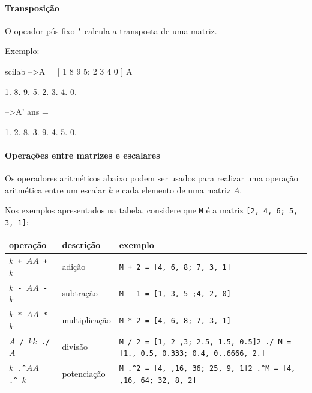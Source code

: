 \documentclass[11pt,fleqn]{practice}
\begin{document}
\paragraph{Transposição}

O opeador pós-fixo \texttt{'} calcula a transposta de uma matriz.

Exemplo:
\begin{lst}{scilab}
-->A = [ 1 8 9 5; 2 3 4 0 ]
 A  =
 
    1.    8.    9.    5.  
    2.    3.    4.    0.  
 
-->A'
 ans  =
 
    1.    2.  
    8.    3.  
    9.    4.  
    5.    0.
\end{lst}


\paragraph{Operações entre matrizes e escalares}

Os operadores aritméticos abaixo podem ser usados para realizar uma
operação aritmética entre um escalar $k$ e cada elemento de uma matriz
$A$.

Nos exemplos apresentados na tabela, considere que \texttt{M} é a matriz
\texttt{[2, 4, 6; 5, 3, 1]}:

\begin{center}
  \begin{tabular}{p{2cm}lp{9cm}} \hline
    \textbf{operação} & \textbf{descrição} & \textbf{exemplo} \\\hline
    \texttt{$k$ + $A$}\newline \texttt{$A$ + $k$}  & adição & \texttt{M + 2 = [4, 6, 8; 7, 3, 1]} \\\hline
    \texttt{$k$ - $A$}\newline \texttt{$A$ - $k$}  & subtração & \texttt{M - 1 = [1, 3, 5 ;4, 2, 0]} \\\hline
    \texttt{$k$ * $A$}\newline \texttt{$A$ * $k$}  & multiplicação & \texttt{M * 2 = [4, 6, 8; 7, 3, 1]} \\\hline
    \texttt{$A$ / $k$}\newline \texttt{$k$ ./ $A$}  & divisão & \texttt{M / 2 = [1, 2 ,3; 2.5, 1.5, 0.5]}\newline  \texttt{2 ./ M = [1., 0.5, 0.333; 0.4, 0..6666, 2.]} \\\hline
    \texttt{$k$ .\textasciicircum $A$}\newline \texttt{$A$ .\textasciicircum\ $k$}  & potenciação & \texttt{M .\textasciicircum 2 = [4, ,16, 36; 25, 9, 1]}\newline \texttt{2 .\textasciicircum M = [4, ,16, 64; 32, 8, 2]} \\\hline
  \end{tabular}
\end{center}
\end{document}
